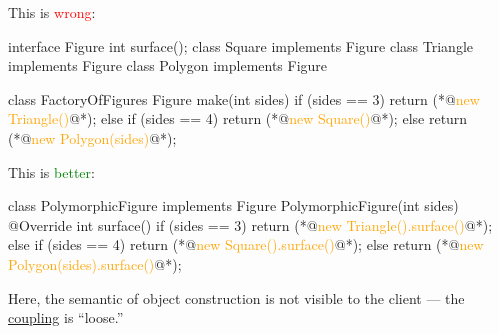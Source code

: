 \documentclass{article}
\begin{document}

\begin{pptWide}{2}
This is \textcolor{red}{wrong}:
\par
{\scriptsize\begin{ffcode}
interface Figure
  int surface();
class Square implements Figure
class Triangle implements Figure
class Polygon implements Figure

class FactoryOfFigures
  Figure make(int sides) {
    if (sides == 3) {
      return (*@\textcolor{orange}{new Triangle()}@*);
    } else if (sides == 4) {
      return (*@\textcolor{orange}{new Square()}@*);
    } else {
      return (*@\textcolor{orange}{new Polygon(sides)}@*);
    }
  }
\end{ffcode}
}
\par\columnbreak\par
This is \textcolor{green}{better}:
\par
{\scriptsize\begin{ffcode}
class PolymorphicFigure implements Figure
  PolymorphicFigure(int sides)
  @Override int surface() {
    if (sides == 3) {
      return (*@\textcolor{orange}{new Triangle().surface()}@*);
    } else if (sides == 4) {
      return (*@\textcolor{orange}{new Square().surface()}@*);
    } else {
      return (*@\textcolor{orange}{new Polygon(sides).surface()}@*);
    }
  }
\end{ffcode}
}
\par
Here, the semantic of object construction is not visible to the client --- the \ul{coupling} is ``loose.''
\end{pptWide}
\plush{}
\end{document}
